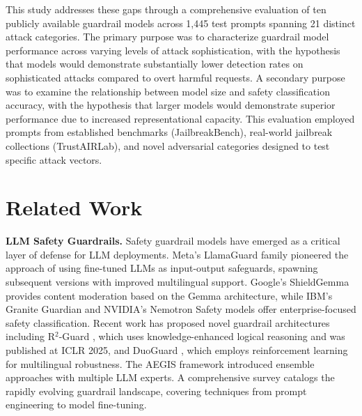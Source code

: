 \documentclass{article}
\begin{document}
This study addresses these gaps through a comprehensive evaluation of ten publicly available guardrail models across 1,445 test prompts spanning 21 distinct attack categories. The primary purpose was to characterize guardrail model performance across varying levels of attack sophistication, with the hypothesis that models would demonstrate substantially lower detection rates on sophisticated attacks compared to overt harmful requests. A secondary purpose was to examine the relationship between model size and safety classification accuracy, with the hypothesis that larger models would demonstrate superior performance due to increased representational capacity. This evaluation employed prompts from established benchmarks (JailbreakBench), real-world jailbreak collections (TrustAIRLab), and novel adversarial categories designed to test specific attack vectors.

\section{Related Work}

\textbf{LLM Safety Guardrails.} Safety guardrail models have emerged as a critical layer of defense for LLM deployments. Meta's LlamaGuard family \cite{inan2023llama} pioneered the approach of using fine-tuned LLMs as input-output safeguards, spawning subsequent versions with improved multilingual support. Google's ShieldGemma provides content moderation based on the Gemma architecture, while IBM's Granite Guardian and NVIDIA's Nemotron Safety models offer enterprise-focused safety classification. Recent work has proposed novel guardrail architectures including R$^2$-Guard \cite{yuan2025r2guard}, which uses knowledge-enhanced logical reasoning and was published at ICLR 2025, and DuoGuard \cite{ghosh2024duoguard}, which employs reinforcement learning for multilingual robustness. The AEGIS framework \cite{ghosh2024aegis} introduced ensemble approaches with multiple LLM experts. A comprehensive survey \cite{liu2024safeguarding_survey} catalogs the rapidly evolving guardrail landscape, covering techniques from prompt engineering to model fine-tuning.
\end{document}
